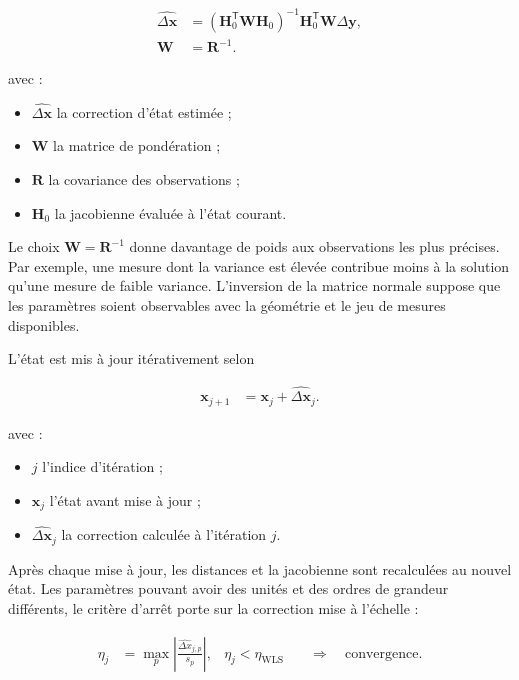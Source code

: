 \begin{align}
\widehat{\Delta\mathbf x}
&=
\left(\mathbf H_0^{\mathsf T}\mathbf W\mathbf H_0\right)^{-1}
\mathbf H_0^{\mathsf T}\mathbf W\Delta\mathbf y,
\\
\mathbf W
&=
\mathbf R^{-1}.
\label{eq:wls_solution}
\end{align}

avec :

\begin{itemize}
    \item $\widehat{\Delta\mathbf x}$ la correction d'état estimée ;
    \item $\mathbf W$ la matrice de pondération ;
    \item $\mathbf R$ la covariance des observations ;
    \item $\mathbf H_0$ la jacobienne évaluée à l'état courant.
\end{itemize}

Le choix $\mathbf W=\mathbf R^{-1}$ donne davantage de poids aux observations
les plus précises. Par exemple, une mesure dont la variance est élevée contribue
moins à la solution qu'une mesure de faible variance. L'inversion de la matrice
normale suppose que les paramètres soient observables avec la géométrie et le
jeu de mesures disponibles.

L'état est mis à jour itérativement selon

\begin{align}
\mathbf x_{j+1}
&=
\mathbf x_j+\widehat{\Delta\mathbf x}_j.
\label{eq:wls_iteration}
\end{align}

avec :

\begin{itemize}
    \item $j$ l'indice d'itération ;
    \item $\mathbf x_j$ l'état avant mise à jour ;
    \item $\widehat{\Delta\mathbf x}_j$ la correction calculée à l'itération
    $j$.
\end{itemize}

Après chaque mise à jour, les distances et la jacobienne sont recalculées au
nouvel état. Les paramètres pouvant avoir des unités et des ordres de grandeur
différents, le critère d'arrêt porte sur la correction mise à l'échelle :

\begin{align}
\eta_j
&=
\max_p\left|
\frac{\widehat{\Delta x}_{j,p}}{s_p}
\right|,
&
\eta_j<\eta_{\mathrm{WLS}}
&\quad\Longrightarrow\quad
\text{convergence}.
\label{eq:wls_stopping_criterion}
\end{align}

